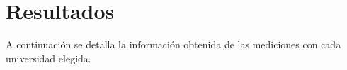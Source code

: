 \section{Resultados}
A continuación se detalla la información obtenida de las mediciones con cada universidad elegida.







